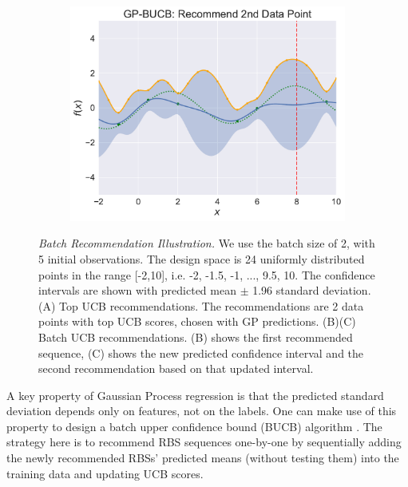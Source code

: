 \begin{figure}
\begin{subfigure}[b]{0.49\textwidth}
        \includegraphics[scale=0.4]{plots/Main_Paper/GP-BUCB_Recommend_2nd_Data_Point.pdf}
    \end{subfigure}
    \caption{\emph{Batch Recommendation Illustration.} We use the batch size of 2, with 5 initial observations. The design space is 24 uniformly distributed points in the range [-2,10], i.e. {-2, -1.5, -1, ..., 9.5, 10}.
    The confidence intervals are shown with predicted mean $\pm$ 1.96 standard deviation.
    (A) Top UCB recommendations. The recommendations are 2 data points with top UCB scores, chosen with GP predictions.
    (B)(C) Batch UCB recommendations. (B) shows the first recommended sequence, (C) shows the new predicted confidence interval and the second recommendation based on that updated interval.}
    \label{fig:batch rec}
\end{figure}


A key property of Gaussian Process regression is that the predicted standard deviation depends only on features, not on the labels. 
One can make use of this property to design a batch upper confidence bound (BUCB) algorithm \cite{desautels2014parallelizing}.
The strategy here is to recommend RBS sequences one-by-one by sequentially adding the newly recommended RBSs' predicted means (without testing them) into the training data and updating UCB scores.\\

